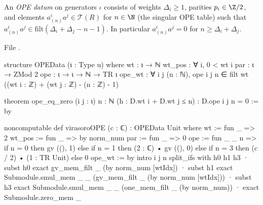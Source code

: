 \begin{definition}\label{l11:def:opedata}
An \emph{OPE datum} on generators $\iota$ consists of weights $\Delta_i\ge1$, parities $p_i\in\Z/2$, and elements
$a^i_{(n)}a^j\in\mathcal T(R)$ for $n\in\N$ (the singular OPE table) such that
$a^i_{(n)}a^j\in\mathrm{filt}(\Delta_i+\Delta_j-n-1)$. In particular $a^i_{(n)}a^j = 0$ for $n\ge\Delta_i+\Delta_j$.
\end{definition}
\noindent File .
\begin{leancode}
structure OPEData (ι : Type u) where
  wt : ι → ℕ
  wt_pos : ∀ i, 0 < wt i
  par : ι → ZMod 2
  ope : ι → ι → ℕ → TR ι
  ope_wt : ∀ i j (n : ℕ), ope i j n ∈ filt wt ((wt i : ℤ) + (wt j : ℤ) - (n : ℤ) - 1)

theorem ope_eq_zero (i j : ι) {n : ℕ} (h : D.wt i + D.wt j ≤ n) : D.ope i j n = 0 := by

noncomputable def virasoroOPE (c : ℂ) : OPEData Unit where
  wt := fun _ => 2
  wt_pos := fun _ => by norm_num
  par := fun _ => 0
  ope := fun _ _ n =>
    if n = 0 then gv ((), 1)
    else if n = 1 then (2 : ℂ) • gv ((), 0)
    else if n = 3 then (c / 2) • (1 : TR Unit)
    else 0
  ope_wt := by
    intro i j n
    split_ifs with h0 h1 h3
    · subst h0
      exact gv_mem_filt _ (by norm_num [wtIdx])
    · subst h1
      exact Submodule.smul_mem _ _ (gv_mem_filt _ (by norm_num [wtIdx]))
    · subst h3
      exact Submodule.smul_mem _ _ (one_mem_filt _ (by norm_num))
    · exact Submodule.zero_mem _
\end{leancode}

